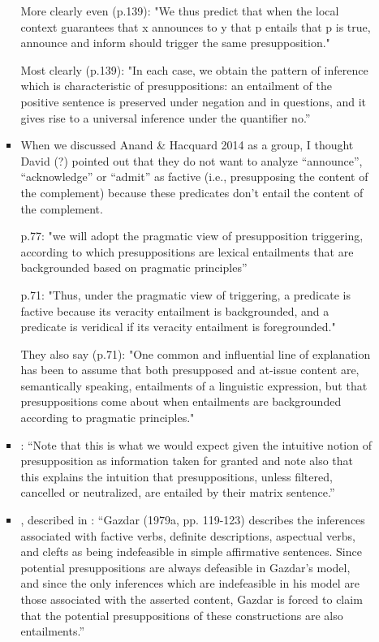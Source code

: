 \documentclass[11pt,fleqn]{article}
\newcommand{\6}{\mbox{$[\hspace*{-.6mm}[$}}
\newcommand{\9}{\mbox{$]\hspace*{-.6mm}]$}}
\begin{document}
\begin{itemize}
\begin{itemize}
\begin{itemize}
More clearly even (p.139): "We thus predict that when the local context guarantees that x announces to y that p entails that p is true, announce and inform should trigger the same presupposition."

Most clearly (p.139): "In each case, we obtain the pattern of inference which is characteristic of presuppositions: an entailment of the positive sentence is preserved under negation and in questions, and it gives rise to a universal inference under the quantifier no.”

\item When we discussed Anand \& Hacquard 2014 as a group, I thought David (?) pointed out that they do not want to analyze “announce”, “acknowledge” or “admit” as factive (i.e., presupposing the content of the complement) because these predicates don’t entail the content of the complement. 

p.77: "we will adopt the pragmatic view of presupposition triggering, according to which presuppositions are lexical entailments that are backgrounded based on pragmatic principles”

p.71: "Thus, under the pragmatic view of triggering, a predicate is factive because its veracity entailment is backgrounded, and a predicate is veridical if its veracity entailment is foregrounded."

They also say (p.71): "One common and influential line of explanation has been to assume that both presupposed and at-issue content are, semantically speaking, entailments of a linguistic expression, but that presuppositions come about when entailments are backgrounded according to pragmatic principles."

\item \citealt[345]{vds92}: ``Note that this is what we would expect given the intuitive notion of presupposition as information taken for granted and note also that this explains the intuition that presuppositions, unless filtered, cancelled or neutralized, are entailed by their matrix sentence.''

\item \citealt[119-123]{gazdar79a}, described in \citealt[66f.]{beaver01}: ``Gazdar (1979a, pp. 119-123) describes the inferences associated with factive verbs, definite descriptions, aspectual verbs, and clefts as being indefeasible in simple affirmative sentences. Since potential presuppositions are always defeasible in Gazdar's model, and since the only inferences which are indefeasible in his model are those associated with the asserted content, Gazdar is forced to claim that the potential presuppositions of these constructions are also entailments.''


\end{itemize}
\end{itemize}
\end{itemize}
\end{document}

